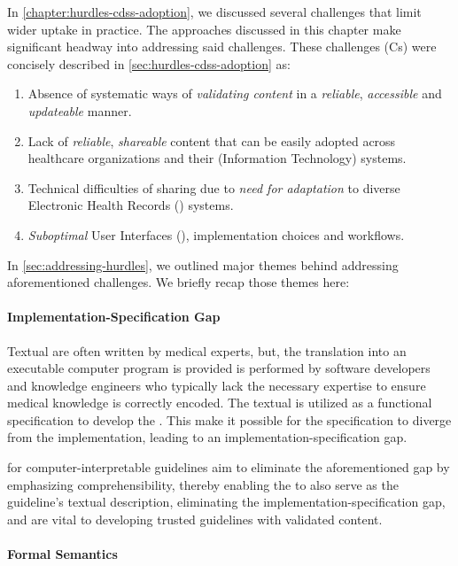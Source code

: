 In \autoref{chapter:hurdles-cdss-adoption}, we discussed several
challenges that limit wider \CDSSs{} uptake in practice. The
approaches discussed in this chapter make significant headway into
addressing said challenges. These challenges (Cs) were concisely
described in \autoref{sec:hurdles-cdss-adoption} as:
\begin{enumerate}[label=C\arabic*.]
\itemsep0.0em
\item Absence of systematic ways of \emph{validating content}
in a \emph{reliable}, \emph{accessible} and \emph{updateable} manner.
\item Lack of \emph{reliable}, \emph{shareable} \CDSS{} content
that can be easily adopted across healthcare organizations and their (Information
Technology) \IT{} systems.
\item Technical difficulties of sharing due to \emph{need for
  adaptation} to diverse Electronic Health Records (\EHR) systems.
\item \emph{Suboptimal} User Interfaces (\UIs), implementation choices and
workflows.
\end{enumerate}

In \autoref{sec:addressing-hurdles}, we outlined major
themes behind addressing aforementioned challenges. We briefly
recap those themes here:

\paragraph{Implementation-Specification Gap}

Textual \BPGs{} are often written by medical experts, but,
the translation into an executable computer program is
provided is performed by software developers and knowledge
engineers who typically lack the necessary expertise to ensure
medical knowledge is correctly encoded. The textual \BPG{} is
utilized as a functional specification to develop the \CDSSs{}.
This make it possible for the specification to diverge from the
implementation, leading to an implementation-specification gap.

\DSLs{} for computer-interpretable guidelines aim to eliminate
the aforementioned gap by emphasizing \HCP{} comprehensibility,
thereby enabling the \CIG{} to also serve as the guideline's
textual description, eliminating the implementation-specification gap,
and are vital to developing trusted guidelines with validated content.

\paragraph{Formal Semantics}

